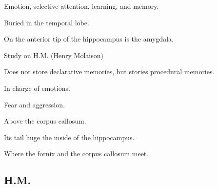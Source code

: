 \begin{coloredlist}
\begin{coloredlist}
\begin{coloredlist}
\begin{coloredlist}
\begin{coloredlist}
                \item Emotion, selective attention, learning, and memory.
                \item Buried in the temporal lobe.
                \item On the anterior tip of the hippocampus is the amygdala.
                \item Study on H.M. (Henry Molaison)
                \item Does not store declarative memories, but stories procedural memories.
            \end{coloredlist}
            \item {}
            \begin{coloredlist}
                \item In charge of emotions.
                \item Fear and aggression.
            \end{coloredlist}
            \item {}
            \begin{coloredlist}
                \item Above the corpus callosum.
            \end{coloredlist}
            \item {}
            \begin{coloredlist}
                \item Its tail huge the inside of the hippocampus.
            \end{coloredlist}
            \item {}
            \item {}
            \begin{coloredlist}
                \item Where the fornix and the corpus callosum meet.
            \end{coloredlist}
        \end{coloredlist}
        \item {}
        \item {}
    \end{coloredlist}

\subsection{H.M.}


\end{coloredlist}
\end{coloredlist}
